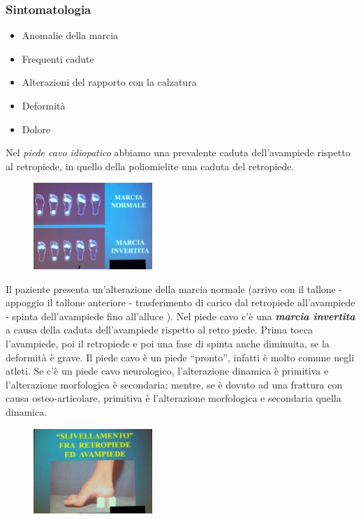 \subsubsection{Sintomatologia}

\begin{itemize}
\item
  Anomalie della marcia
\item
  Frequenti cadute
\item
  Alterazioni del rapporto con la calzatura
\item
  Deformità
\item
  Dolore
\end{itemize}

Nel \emph{piede cavo idiopatico} abbiamo una prevalente caduta dell'avampiede rispetto al retropiede, in quello della poliomielite una caduta del retropiede.

\begin{figure}[!ht]
\centering
\includegraphics[width=0.4\textwidth]{017/image10.jpg}
\end{figure}

Il paziente presenta un'alterazione della marcia normale (arrivo con il tallone - appoggio il tallone anteriore - trasferimento di carico dal retropiede all'avampiede - spinta dell'avampiede fino all'alluce ). Nel piede cavo c'è una \textbf{\emph{marcia invertita}} a causa della caduta dell'avampiede rispetto al retro piede. Prima tocca l'avampiede, poi il retropiede e poi una fase di spinta anche diminuita, se la deformità è grave. Il piede cavo è un piede ``pronto'', infatti è molto comune negli atleti. Se c'è un piede cavo neurologico, l'alterazione dinamica è
primitiva e l'alterazione morfologica è secondaria; mentre, se è dovuto ad una frattura con causa osteo-articolare, primitiva è l'alterazione morfologica e secondaria quella dinamica.

\begin{figure}[!ht]
\centering
\includegraphics[width=0.4\textwidth]{017/image11.jpg}
\end{figure}

